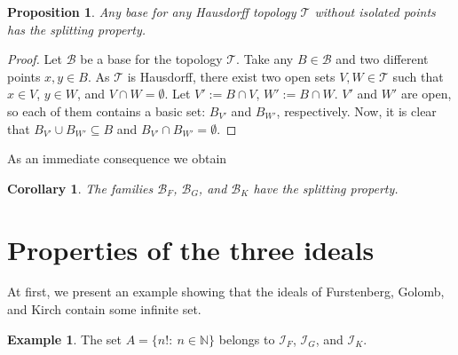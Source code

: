 \documentclass{amsart}
\newtheorem{prop}[thm]{Proposition}
\newtheorem{cor}[thm]{Corollary}
\theoremstyle{definition}
\newtheorem{ex}[thm]{Example}
\newcommand{\N}{{\mathbb N}}
\newcommand{\I}{\mathcal I}
\newcommand{\T}{\mathcal{T}}
\newcommand{\B}{\mathcal{B}}
\begin{document}
\begin{prop} \label{remH}
Any base for any Hausdorff topology $\T$ without isolated points has the splitting property.
\end{prop}

\begin{proof}
Let $\B$ be a base for the topology $\T$. Take any $B\in\B$ and two different points $x,y\in B$. As $\T$ is Hausdorff, there exist two open sets $V,W\in\T$ such that $x\in V$, $y\in W$, and $V\cap W = \emptyset$. Let $V':=B\cap V$, $W':=B\cap W$. $V'$ and $W'$ are open, so each of them contains a basic set: $B_{V'}$ and $B_{W'}$, respectively. Now, it is clear that $B_{V'}\cup B_{W'}\subseteq B$ and $B_{V'}\cap B_{W'}=\emptyset$.
\end{proof}

As an immediate consequence we obtain

\begin{cor}
The families $\B_F$, $\B_G$, and $\B_K$ have the splitting property.
\end{cor}

\section{Properties of the three ideals}\label{examples}

At first, we present an example showing that the ideals of Furstenberg, Golomb, and Kirch contain some infinite set.

\begin{ex}\label{n-factorial} 
The set $A = \{n! :\ n\in\N\}$ belongs to $\I_F$, $\I_G$, and $\I_K$.
\end{ex}
\end{document}
